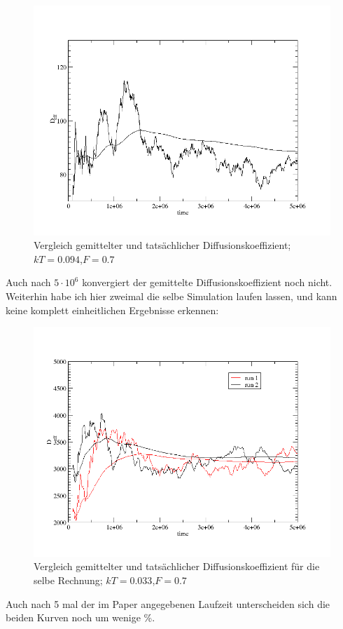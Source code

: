 \documentclass[12pt,a4paper]{article}
\begin{document}
\begin{figure}[H]
	\centering
	\includegraphics[scale=0.6]{deff94.png} 
	\caption{Vergleich gemittelter und tatsächlicher Diffusionskoeffizient; $kT=0.094$,$F=0.7$}
	\label{deff94}
\end{figure}
Auch nach $5\cdot10^6$ konvergiert der gemittelte Diffusionskoeffizient noch nicht.\\
Weiterhin habe ich hier zweimal die selbe Simulation laufen lassen, und kann keine komplett einheitlichen Ergebnisse erkennen:
\begin{figure}[H]
	\centering
	\includegraphics[scale=0.6]{deffcomp.png} 
	\caption{Vergleich gemittelter und tatsächlicher Diffusionskoeffizient für die selbe Rechnung; $kT=0.033$,$F=0.7$}
	\label{deffcomp}
\end{figure}
Auch nach 5 mal der im Paper angegebenen Laufzeit unterscheiden sich die beiden Kurven noch um wenige \%.\\
\end{document}
